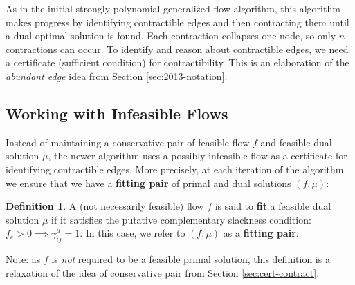 \documentclass[11pt]{article}
\theoremstyle{definition}
\newtheorem{definition}{Definition}[section]
\theoremstyle{definition}
\theoremstyle{definition}
\newcommand{\giij}{\gamma_{ij}^{\mu}}
\begin{document}
	
	
    
    As in the initial strongly polynomial generalized flow algorithm, this algorithm makes progress by
    identifying contractible edges and then contracting them until a dual optimal
    solution is found. Each contraction collapses one node, so only $n$ contractions
    can occur. To identify and reason about contractible edges, we need a certificate
    (sufficient condition) for contractibility. This is an elaboration of the \emph{abundant edge}
    idea from Section \ref{sec:2013-notation}.

	\subsection{Working with Infeasible Flows}\label{sec:infeasible}
    
	Instead of maintaining a conservative pair of feasible flow $f$ and feasible
	dual solution $\mu$, the newer algorithm uses a possibly infeasible flow
	as a certificate for identifying contractible edges.
	More precisely,
    at each iteration of the algorithm we ensure that we have a \textbf{fitting pair}
	of primal and dual solutions $(f,\mu)$:
	\begin{definition}
	A (not necessarily feasible) flow $f$ is said to \textbf{fit} a feasible dual solution $\mu$
    if it satisfies the putative complementary slackness condition: $f_e > 0 \implies \giij = 1$.
    In this case, we refer to $(f, \mu)$ as a \textbf{fitting pair}.
	\end{definition}
    Note: as $f$ is \emph{not} required to be a feasible primal solution,
    this definition is a relaxation of the idea of
	conservative pair from Section \ref{sec:cert-contract}.
    
\end{document}
